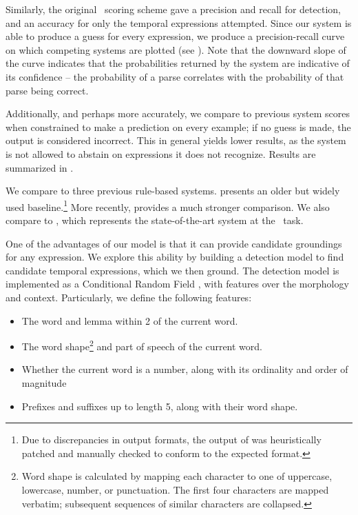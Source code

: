 
Similarly, the original \tempeval\ scoring scheme gave a precision 
	and recall for detection, and an accuracy for only the temporal expressions 
	attempted.
Since our system is able to produce a guess for every expression, we produce
	a precision-recall curve on which competing systems are plotted
	(see ).
Note that the downward slope of the curve indicates that the probabilities
	returned by the system are indicative of its confidence -- the probability
	of a parse correlates with the probability of that parse being correct.

Additionally, and perhaps more accurately, we compare to 
	previous system scores when constrained to make a prediction on every
	example; if no guess is made, the output is considered incorrect.
This in general yields lower results, as the system is not allowed to
	abstain on expressions it does not recognize.
Results are summarized in .

We compare to three previous rule-based systems.
 \cite{key:2000mani-temporal} presents an older but widely
	used baseline.\footnote{
		Due to discrepancies in output formats, 
			the output of  was heuristically patched
			and manually checked to conform to the expected format.
	}
More recently,  \cite{key:2012chang-temporal} 
	provides a much stronger comparison.
We also compare to  \cite{key:2010strotgen-temporal}, 
	which represents the state-of-the-art system at the \tempeval\ task.

One of the advantages of our model is that it can provide candidate groundings for any
	expression.
We explore this ability by building a detection model to find candidate temporal
	expressions, which we then ground.
The detection model is implemented as a Conditional Random Field \cite{key:2001lafferty-crf}, 
	with features over the morphology and context.
Particularly, we define the following features:
\begin{itemize}
\item The word and lemma within 2 of the current word.
\item The word shape\footnote{
		Word shape is calculated by mapping each character to one of uppercase, lowercase, number,
			or punctuation.
		The first four characters are mapped verbatim; subsequent sequences of similar characters
			are collapsed.
	}
	and part of speech of the current word.
\item Whether the current word is a number, along with its ordinality and order of magnitude
\item Prefixes and suffixes up to length 5, along with their word shape.
\end{itemize}

